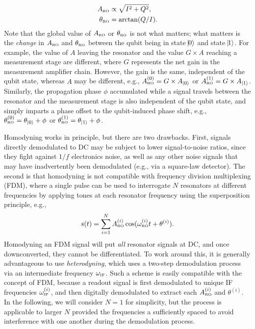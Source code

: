 \documentclass[aip,apr,twocolumn,showpacs,superscriptaddress,groupedaddress,nofootinbib,reprint]{revtex4-1}  %
\begin{document}
\begin{align}
  A_{\mbox{\tiny{RO}}} &\propto \sqrt{I^2 + Q^2}, \\
  \theta_{\mbox{\tiny{RO}}} &= \arctan(Q/I).
\end{align}
%
%
Note that the global value of $A_{\mbox{\tiny{RO}}}$ or $\theta_{\mbox{\tiny{RO}}}$ is not what matters; what matters is the \textit{change} in $A_{\mbox{\tiny{RO}}}$ and $\theta_{\mbox{\tiny{RO}}}$ between the qubit being in state $\vline 0 \rangle$ and state $\vline 1 \rangle$. For example, the value of $A$ leaving the resonator and the value $G \times A$ reaching a measurement stage are different, where $G$ represents the net gain in the measurement amplifier chain. However, the gain is the same, independent of the qubit state, whereas $A$ may be different, e.g., $A_{\mbox{\tiny{RO}}}^{(0)}=G \times A_{\lvert 0 \rangle}$ or $A_{\mbox{\tiny{RO}}}^{(1)}=G \times A_{\lvert 1 \rangle}$. Similarly, the propagation phase $\phi$ accumulated while a signal travels between the resonator and the measurement stage is also independent of the qubit state, and simply imparts a phase offset to the qubit-induced phase shift, e.g., $\theta_{\mbox{\tiny{RO}}}^{(0)}=\theta_{\lvert 0 \rangle} + \phi$ or $\theta_{\mbox{\tiny{RO}}}^{(1)}=\theta_{\lvert 1 \rangle} + \phi$.

Homodyning works in principle, but there are two drawbacks. First, signals directly demodulated to DC may be subject to lower signal-to-noise ratios, since they fight against $1/f$ electronics noise, as well as any other noise signals that may have inadvertently been demodulated (e.g., via a square-law detector). The second is that homodyning is not compatible with frequency division multiplexing (FDM), where a single pulse can be used to interrogate $N$ resonators at different frequencies by applying tones at each resonator frequency using the superposition principle, e.g.,
\begin{equation}
s(t) = \sum_{i=1}^N A_{\mbox{\tiny{RO}}}^{(i)} \cos(\omega_{\mbox{\tiny{RO}}}^{(i)}t + \theta^{(i)}).
\end{equation}
Homodyning an FDM signal will put \textit{all} resonator signals at DC, and once downconverted, they cannot be differentiated.
To work around this, it is generally advantageous to use \textit{heterodyning}, which uses a two-step demodulation process via an intermediate frequency $\omega_{\mbox{\tiny{IF}}}$. Such a scheme is easily compatible with the concept of FDM, because a readout signal is first demodulated to unique IF frequencies  $\omega_{\mbox{\tiny{IF}}}^{(i)}$, and then digitally demodulated to extract each $A_{\mbox{\tiny{RO}}}^{(i)}$ and $\theta^{(i)}$.
In the following, we will consider $N=1$ for simplicity, but the process is applicable to larger $N$ provided the frequencies a sufficiently spaced to avoid interference with one another during the demodulation process.
\end{document}
